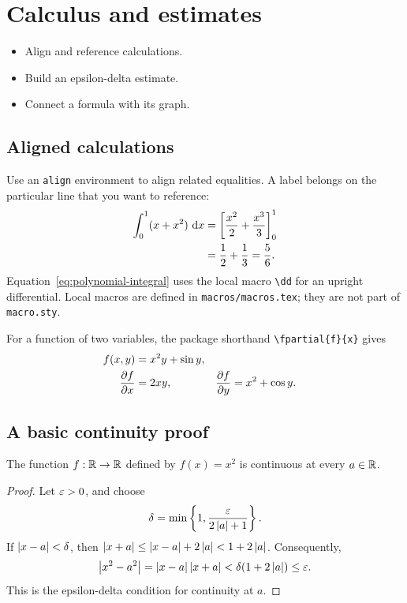 \documentclass[../../main.tex]{subfiles}
\begin{document}
\chapter{Calculus and estimates}
\label{ch:calculus}

\begin{objectives}
\begin{itemize}
  \item Align and reference calculations.
  \item Build an epsilon-delta estimate.
  \item Connect a formula with its graph.
\end{itemize}
\end{objectives}

\section{Aligned calculations}
Use an \texttt{align} environment to align related equalities. A label belongs
on the particular line that you want to reference:
\begin{align}
  \int_0^1 (x+x^2)\,\mathop{}\!\mathrm{d} x
    &=\left[\frac{x^2}{2}+\frac{x^3}{3}\right]_0^1 \notag\\
    &=\frac12+\frac13=\frac56.\label{eq:polynomial-integral}
\end{align}
Equation~\eqref{eq:polynomial-integral} uses the local macro \verb|\dd| for
an upright differential. Local macros are defined in
\texttt{macros/macros.tex}; they are not part of \texttt{macro.sty}.

For a function of two variables, the package shorthand
\verb|\fpartial{f}{x}| gives
\[
\begin{aligned}
  f(x,y)&=x^2y+\sin y,\\
  \frac{\partial f}{\partial x}&=2xy,
  &\frac{\partial f}{\partial y}&=x^2+\cos y.
\end{aligned}
\]

\section{A basic continuity proof}
\begin{theorem}\label{thm:square-continuous}
The function $f:\mathbb R\to\mathbb R$ defined by $f(x)=x^2$ is continuous at every
$a\in\mathbb R$.
\end{theorem}
\begin{proof}
Let $\varepsilon>0$, and choose
\[
  \delta=\min\left\{1,\frac{\varepsilon}{2\left\lvert a \right\rvert+1}\right\}.
\]
If $\left\lvert x-a \right\rvert<\delta$, then $\left\lvert x+a \right\rvert\le\left\lvert x-a \right\rvert+2\left\lvert a \right\rvert<1+2\left\lvert a \right\rvert$.
Consequently,
\[
  \left\lvert x^2-a^2 \right\rvert=\left\lvert x-a \right\rvert\left\lvert x+a \right\rvert
  <\delta(1+2\left\lvert a \right\rvert)\le\varepsilon.
\]
This is the epsilon-delta condition for continuity at $a$.
\end{proof}
\end{document}
